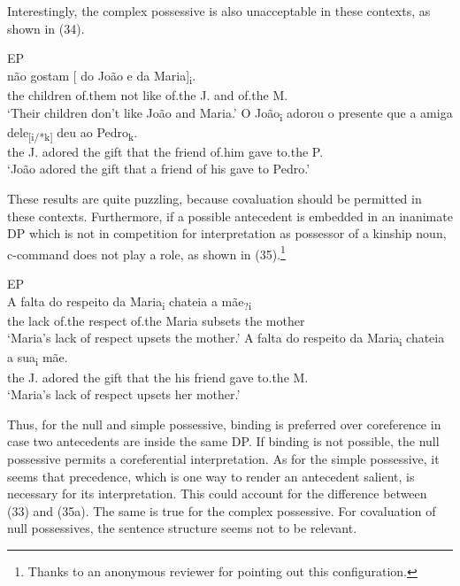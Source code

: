 \documentclass[output=paper]{langsci/langscibook}
\begin{document}
Interestingly, the complex possessive is also unacceptable in these contexts, as shown in (34).

\ea%
         EP\label{ex:wein:34}\\
    \ea  
    \gll {} não gostam [ do João e da Maria]\textsubscript{i}.\\
         {} the children of.them not like {} of.the J. and of.the M.\\
    \glt ‘Their children don’t like João and Maria.’
    \ex  
    \gll O João\textsubscript{i} adorou o presente que a amiga dele\textsubscript{[i/*k]} deu ao Pedro\textsubscript{k}.\\
         the J. adored the gift that the friend of.him gave to.the P.\\
    \glt ‘João adored the gift that a friend of his gave to Pedro.’
    \z
\z

These results are quite puzzling, because covaluation should be permitted in these contexts. Furthermore, if a possible antecedent is embedded in an inanimate DP which is not in competition for interpretation as possessor of a kinship noun, c-command does not play a role, as shown in (35).\footnote{Thanks to an anonymous reviewer for pointing out this configuration.}

\ea%
         EP\label{ex:wein:35}\\
    \ea            
    \gll A falta do respeito da Maria\textsubscript{i} chateia a mãe\textsubscript{?i}\\
         the lack of.the respect of.the Maria subsets the mother\\
    \glt ‘Maria’s lack of respect upsets the mother.’
    \ex  
    \gll A falta do respeito da Maria\textsubscript{i} chateia a sua\textsubscript{i} mãe.\\
         the J. adored the gift that the his friend gave to.the M.\\
    \glt ‘Maria’s lack of respect upsets her mother.’
    \z
\z

Thus, for the null and simple possessive, binding is preferred over coreference in case two antecedents are inside the same DP. If binding is not possible, the null possessive permits a coreferential interpretation. As for the simple possessive, it seems that precedence, which is one way to render an antecedent salient, is necessary for its interpretation. This could account for the difference between (33) and (35a). The same is true for the complex possessive. For covaluation of null possessives, the sentence structure seems not to be relevant.
\end{document}
